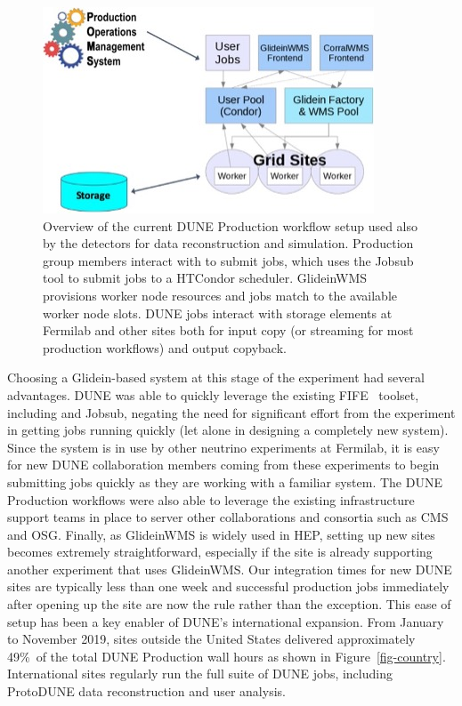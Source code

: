 \documentclass[../main-v1.tex]{subfiles}
\begin{document}
\begin{figure}[htb]
\centering
\includegraphics[width=\textwidth]{graphics/Workflow/POMSWorkflow.jpg}
\caption{Overview of the current DUNE Production workflow setup used also by the  detectors for data reconstruction and simulation. Production group members interact with  to submit jobs, which uses the Jobsub tool to submit jobs to a HTCondor scheduler. GlideinWMS provisions worker node resources and jobs match to the available worker node slots. DUNE jobs interact with storage elements  at Fermilab and other sites both for input copy (or streaming for most production workflows) and output copyback.}
\label{fig:workflowPOMS}       %
\end{figure}

Choosing a Glidein-based system at this stage of the experiment had several advantages. DUNE was able to quickly leverage the existing FIFE~\cite{herner2019advances} toolset, including  and Jobsub, negating the
need for significant effort from the experiment in getting jobs running quickly (let alone in designing a completely new system). Since the system is in use by other neutrino experiments at Fermilab, it is easy for new DUNE collaboration members coming from these experiments to 
begin submitting jobs quickly as they are working with a familiar system. The DUNE Production workflows were also able to leverage the existing infrastructure support teams in place to server other collaborations and consortia such as 
CMS and OSG. Finally, as GlideinWMS is widely used in HEP, setting up new sites becomes extremely straightforward, especially if the site is already supporting another experiment that uses GlideinWMS. Our integration times for new 
DUNE sites are typically less than one week and successful production jobs immediately after opening up the site are now the rule rather than the exception. This ease of setup has been a key enabler of DUNE's international expansion. From January to November 2019, sites outside the United States delivered approximately 49\%\ of the total DUNE Production wall hours as shown in Figure~\ref{fig-country}. International sites regularly run the full suite of DUNE jobs, including ProtoDUNE data reconstruction and user analysis. %
\end{document}
